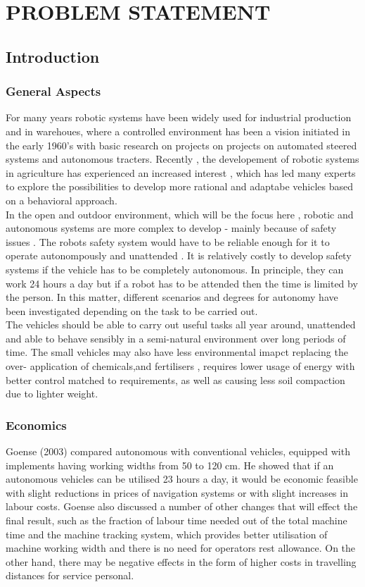 \documentclass{report}
\begin{document}
\chapter{PROBLEM STATEMENT}
\section{Introduction}
\subsection{General Aspects}
For many years robotic systems have been widely used for industrial production and in warehoues, where a controlled environment has been a vision initiated in the early 1960's with basic research on projects on projects on automated steered systems and autonomous tracters. Recently , the developement of robotic systems in agriculture has experienced an increased interest , which has led many experts to explore the possibilities to develop more rational and adaptabe vehicles based on a behavioral approach.\\
In the open and outdoor environment, which will be the focus here , robotic and autonomous systems are more complex to develop - mainly because of safety issues . The robots safety system would have to be reliable enough for it to operate autonompously and unattended . It is relatively costly to develop safety systems if the vehicle has to be completely autonomous. In principle, they can work 24 hours a day but if a robot has to be attended then the time is limited by the person. In this matter, different scenarios and degrees for autonomy have been investigated depending on the task to be carried out.\\
The vehicles should be able to carry out useful tasks all year around, unattended and able to behave sensibly in a semi-natural environment over long periods of time. The small vehicles may also have less environmental imapct replacing the over- application of chemicals,and fertilisers , requires lower usage of energy with better control matched to requirements, as well as causing less soil compaction due to lighter weight.
\subsection{Economics}
Goense (2003) compared autonomous with conventional vehicles, equipped with implements having working
widths from 50 to 120 cm. He showed that if an autonomous vehicles can be utilised 23 hours a day, it would
be economic feasible with slight reductions in prices of navigation systems or with slight increases in labour
costs. Goense also discussed a number of other changes that will effect the final result, such as the fraction
of labour time needed out of the total machine time and the machine tracking system, which provides better
utilisation of machine working width and there is no need for operators rest allowance. On the other hand,
there may be negative effects in the form of higher costs in travelling distances for service personal.
\end{document}
